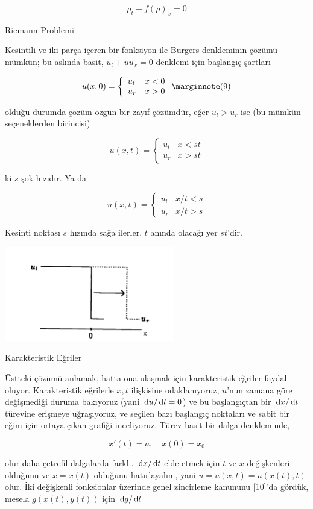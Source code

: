 \documentclass[12pt,fleqn]{article}\usepackage{../../common}
\begin{document}
$$
\rho_t + f(\rho)_x = 0
$$


Riemann Problemi

Kesintili ve iki parça içeren bir fonksiyon ile Burgers denkleminin çözümü
mümkün; bu aslında basit, $u_t + u u_x = 0$ denklemi için başlangıç şartları

$$
u(x,0) = 
\left\{ \begin{array}{ll}
u_l & x < 0 \\
u_r & x > 0 
\end{array} \right.
\mlabel{9}
$$

olduğu durumda çözüm özgün bir zayıf çözümdür, eğer $u_l > u_r$ ise (bu mümkün
seçeneklerden birincisi)

$$
u(x,t) = 
\left\{ \begin{array}{ll}
u_l & x < st \\
u_r & x > st 
\end{array} \right.
$$

ki $s$ şok hızıdır. Ya da

$$
u(x,t) = 
\left\{ \begin{array}{ll}
u_l & x/t < s \\
u_r & x/t > s 
\end{array} \right.
$$

Kesinti noktası $s$ hızında sağa ilerler, $t$ anında olacağı yer $st$'dir.

\includegraphics[width=20em]{compscieng_bpp50fv1_01.png}

Karakteristik Eğriler

Üstteki çözümü anlamak, hatta ona ulaşmak için karakteristik eğriler faydalı
oluyor. Karakteristik eğrilerle $x,t$ ilişkisine odaklanıyoruz, $u$'nun zamana
göre değişmediği duruma bakıyoruz (yani $\,\mathrm{d} u / \,\mathrm{d} t = 0$) ve bu başlangıçtan
bir $\,\mathrm{d} x / \,\mathrm{d} t$ türevine erişmeye uğraşıyoruz, ve seçilen bazı başlangıç
noktaları ve sabit bir eğim için ortaya çıkan grafiği inceliyoruz. Türev basit
bir dalga denkleminde,

$$
x'(t) = a, \quad x(0) = x_0
$$

olur daha çetrefil dalgalarda farklı. $\,\mathrm{d} x / \,\mathrm{d} t$ elde etmek için $t$ ve $x$
değişkenleri olduğunu ve $x = x(t)$ olduğunu hatırlayalım, yani $u = u(x,t) =
u(x(t),t)$ olur. İki değişkenli fonksionlar üzerinde genel zincirleme kanununu
[10]'da gördük, mesela $g(x(t),y(t))$ için $\,\mathrm{d} g / \,\mathrm{d} t$
\end{document}

